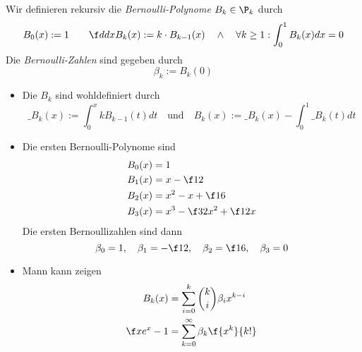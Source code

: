 \documentclass[11pt]{scrbook}
\begin{document}
\begin{df}
	\label{2.34}
	Wir definieren rekursiv die \emph{Bernoulli-Polynome} $B_k \in \P_k$ durch
	\[
		B_0(x) := 1 \qquad
		\f d{dx} B_k(x) := k \cdot B_{k-1}(x) \quad \land \quad \forall k\ge 1 : \int_0^1 B_k(x) dx = 0
	\]
	Die \emph{Bernoulli-Zahlen} sind gegeben durch
	\[
		\beta_k := B_k(0)
	\]
	\begin{note}
		\begin{itemize}
			\item
				Die $B_k$ sind wohldefiniert durch
				\[
					\_{B_k}(x) := \int_0^x k B_{k-1}(t) dt 
					\quad \text{und} \quad
					B_k(x) := \_{B_k}(x) - \int_0^1 \_{B_k}(t) dt
				\]
			\item
				Die ersten Bernoulli-Polynome sind
				\begin{align*}
					B_0(x) &= 1  \\
					B_1(x) &= x - \f 12 \\
					B_2(x) &= x^2 - x + \f 16 \\
					B_3(x) &= x^3 - \f 32 x^2 + \f 12 x
				\end{align*}
				Die ersten Bernoullizahlen sind dann
				\[
					\beta_0 = 1, \quad
					\beta_1 = -\f 12, \quad
					\beta_2 = \f 16, \quad
					\beta_3 = 0
				\]
			\item
				Mann kann zeigen
				\begin{align*}
					B_k(x) &= \sum_{i=0}^k \binom ki \beta_i x^{k-i} \\
					\f x{e^x - 1} &= \sum_{k=0}^\infty \beta_k \f {x^k}{k!}
				\end{align*}
		\end{itemize}
	\end{note}
\end{df}
\end{document}
